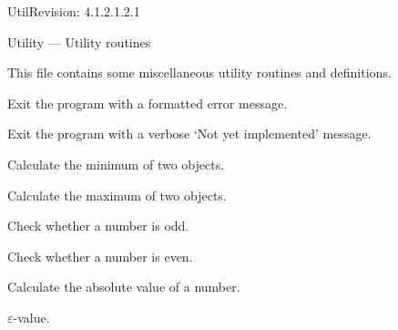 %
%
% 
% 
% 
% 
%

\begin{manpage}{\libtitle}{Util}{$ $Revision: 4.1.2.1.2.1 $ $}

\subtitle{Name}
    Utility --- Utility routines


\subtitle{Description}
    This file contains some miscellaneous utility routines and definitions.


\subtitle{Declaration}


\subtitle{Operations}

    Exit the program with a formatted error message.

    Exit the program with a verbose `Not yet implemented' message.

    Calculate the minimum of two objects.

    Calculate the maximum of two objects.

    Check whether a number is odd.

    Check whether a number is even.

    Calculate the absolute value of a number.


\subtitle{Definitions}

    $\varepsilon$-value.


\subtitle{Revision}

\end{manpage}
